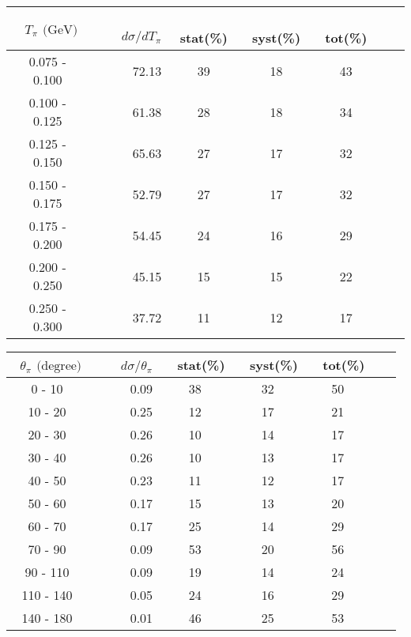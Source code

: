 \documentclass[aps, prd, reprint,showpacs,  preprintnumbers,amsmath,amssymb,superscriptaddress, nofootinbib]{revtex4-1}
\makeatletter
\renewenvironment{table}
  {\def\@captype{table}}
  {}
\makeatother
\begin{document}
\begin{table}
\centering
\begin{tabular}{crccccc}
\hline
~$T_{\pi}$ $\text{(GeV)}$ &~~~ $d\sigma/dT_{\pi}$ &~ stat(\%) &~ syst(\%) &~ tot(\%)  \\
\hline
0.075 - 0.100 &  72.13 & 39 & 18 & 43 \\ 
0.100 - 0.125 &  61.38 & 28 & 18 & 34 \\ 
0.125 - 0.150 &  65.63 & 27 & 17 & 32 \\ 
0.150 - 0.175 &  52.79 & 27 & 17 & 32 \\ 
0.175 - 0.200 &  54.45 & 24 & 16 & 29 \\ 
0.200 - 0.250 &  45.15 & 15 & 15 & 22 \\ 
0.250 - 0.300 &  37.72 & 11 & 12 & 17 \\ 
\hline
\hline
\end{tabular}
\caption{ Flux-averaged differential cross section in $T_{\pi}$, 
$d\sigma/dT_{\pi} (10^{-40}\text{cm}^2/\text{nucleon}/\text{GeV})$, 
for $\pi^-$+nucleon(s) production with statistical (stat), systematic (syst), and total (tot) uncertainties.}
\label{tb:pi0-kinetic-energy}
\end{table}
\vspace{0.4cm}

\begin{table}
\centering
\begin{tabular}{crccccc}
\hline
~$\theta_\pi$ $\text{(degree)}$ &~~~ $d\sigma/\theta_\pi$ &~ stat(\%) &~ syst(\%) &~ tot(\%)  \\
\hline
    0 -    10 &   0.09 & 38 & 32 & 50 \\ 
   10 -    20 &   0.25 & 12 & 17 & 21 \\ 
   20 -    30 &   0.26 & 10 & 14 & 17 \\ 
   30 -    40 &   0.26 & 10 & 13 & 17 \\ 
   40 -    50 &   0.23 & 11 & 12 & 17 \\ 
   50 -    60 &   0.17 & 15 & 13 & 20 \\ 
   60 -    70 &   0.17 & 25 & 14 & 29 \\ 
   70 -    90 &   0.09 & 53 & 20 & 56 \\ 
   90 -   110 &   0.09 & 19 & 14 & 24 \\ 
  110 -   140 &   0.05 & 24 & 16 & 29 \\ 
  140 -   180 &   0.01 & 46 & 25 & 53 \\ 
\hline
\hline
\end{tabular}
\caption{ Flux-averaged differential cross section in $\theta_\pi$, 
$d\sigma/d\theta_{\pi} (10^{-40}\text{cm}^2/\text{nucleon}/\text{degree})$, 
for $\pi^-$+nucleon(s) production with statistical (stat), systematic (syst), and total (tot) uncertainties.}
\label{tb:pi0-theta}
\end{table}
\vspace{0.4cm}
\end{document}
